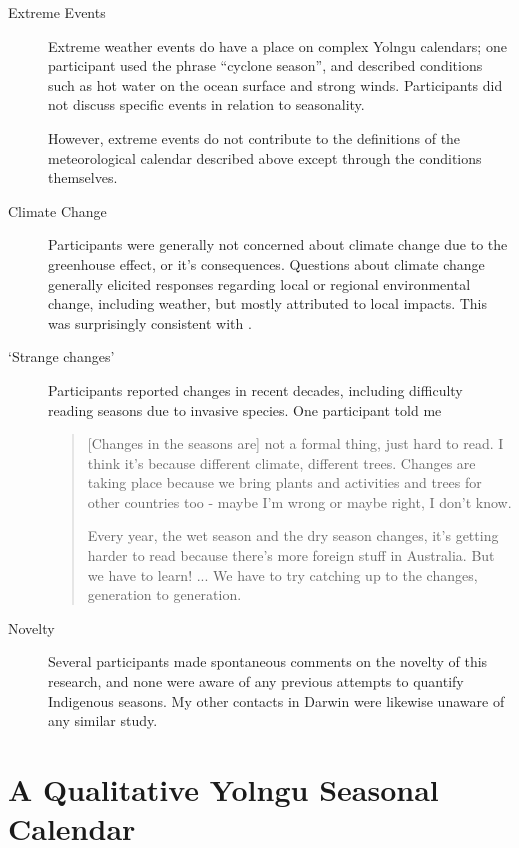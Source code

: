\begin{description}
\item[Extreme Events]
    Extreme weather events do have a place on complex Yolngu calendars;
    one participant used the phrase ``cyclone season'', and described
    conditions such as hot water on the ocean surface and strong winds.
    Participants did not discuss specific events in relation to seasonality.

    However, extreme events do not contribute to the definitions of the
    meteorological calendar described above except through the conditions
    themselves.

\item[Climate Change]
    Participants were generally not concerned about climate change due to
    the greenhouse effect, or it's consequences.  Questions about climate
    change generally elicited responses regarding local or regional
    environmental change, including weather, but mostly attributed to
    local impacts.  This was surprisingly consistent with \citet{petheram2010}.

\item[`Strange changes']
    Participants reported changes in recent decades, including difficulty
    reading seasons due to invasive species.  One participant told me
    \begin{quote}
    [Changes in the seasons are] not a formal thing, just hard to read.
    I think it's because different climate, different trees.  Changes are
    taking place because we bring plants and activities and trees for
    other countries too - maybe I'm wrong or maybe right, I don't know.

    Every year, the wet season and the dry season changes, it's getting
    harder to read because there's more foreign stuff in Australia.
    But we have to learn! ... We have to try catching up to the changes,
    generation to generation.
    \end{quote}


\item[Novelty]
    Several participants made spontaneous comments on the novelty of this
    research, and none were aware of any previous attempts to quantify
    Indigenous seasons.  My other contacts in Darwin were likewise unaware
    of any similar study.
\end{description}



\section{A Qualitative Yolngu Seasonal Calendar}
\label{sec:calendar-description}

